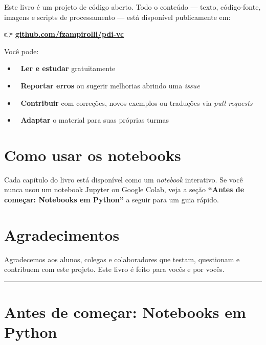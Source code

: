 \documentclass[
  portuguese,
  letterpaper,
  openany,
  oneside,
  12pt,
  a4paper]{book}
\providecommand{\tightlist}{%
  \setlength{\itemsep}{0pt}\setlength{\parskip}{0pt}}
\begin{document}

Este livro é um projeto de código aberto. Todo o conteúdo --- texto,
código-fonte, imagens e scripts de processamento --- está disponível
publicamente em:

👉
\textbf{\href{https://github.com/fzampirolli/pdi-vc/}{github.com/fzampirolli/pdi-vc}}

Você pode:

\begin{itemize}
\tightlist
\item
  📖 \textbf{Ler e estudar} gratuitamente
\item
  🐛 \textbf{Reportar erros} ou sugerir melhorias abrindo uma
  \emph{issue}
\item
  🤝 \textbf{Contribuir} com correções, novos exemplos ou traduções via
  \emph{pull requests}
\item
  🔧 \textbf{Adaptar} o material para suas próprias turmas
\end{itemize}

\section*{Como usar os notebooks}\label{como-usar-os-notebooks}


Cada capítulo do livro está disponível como um \emph{notebook}
interativo. Se você nunca usou um notebook Jupyter ou Google Colab, veja
a seção \textbf{``Antes de começar: Notebooks em Python''} a seguir para
um guia rápido.

\section*{Agradecimentos}\label{agradecimentos}


Agradecemos aos alunos, colegas e colaboradores que testam, questionam e
contribuem com este projeto. Este livro é feito para vocês e por vocês.

\begin{center}\rule{0.5\linewidth}{0.5pt}\end{center}

\section*{Antes de começar: Notebooks em
Python}\label{antes-de-comeuxe7ar-notebooks-em-python}
\end{document}
